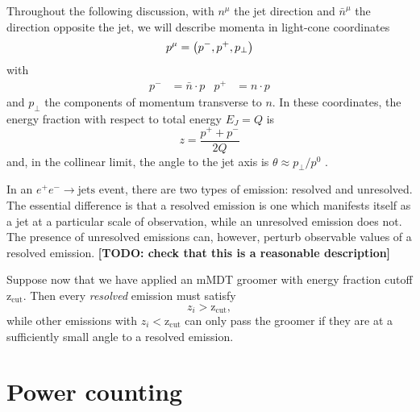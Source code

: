 \documentclass[12pt,twoside,class=../reedthesis, crop=false]{standalone}
\providecommand{\zcut}{\mathrm{z_{cut}}}
\begin{document}
	Throughout the following discussion, with $n^\mu$ the jet direction and $\bar n^\mu$ the direction opposite the jet, we will describe momenta in light-cone coordinates
	\begin{equation}
		p^\mu = \qty(p^-, p^+, p_\perp)
	\end{equation}
	with
	\begin{align}
		p^- &= \bar n \cdot p & p^+ &= n \cdot p
	\end{align}
	and $p_\perp$ the components of momentum transverse to $n$. In these coordinates, the energy fraction with respect to total energy $E_J = Q$ is
	\begin{equation}\label{eq:z light cone coordinates}
		z = \frac{p^+ + p^-}{2Q}
	\end{equation}
	and, in the collinear limit, the angle to the jet axis is $\theta \approx p_\perp / p^0$ \cite{frye_factorization_2016}.
	
	In an $e^+ e^- \to \text{jets}$ event, there are two types of emission: resolved and unresolved. The essential difference is that a resolved emission is one which manifests itself as a jet at a particular scale of observation, while an unresolved emission does not. The presence of unresolved emissions can, however, perturb observable values of a resolved emission. {\color{red}\textbf{[TODO: check that this is a reasonable description]}} 

	Suppose now that we have applied an mMDT groomer with energy fraction cutoff $\zcut$. Then every \textit{resolved} emission must satisfy
	\begin{equation}
		z_i > \zcut,
	\end{equation}
	while other emissions with $z_i < \zcut$ can only pass the groomer if they are at a sufficiently small angle to a resolved emission.

\section{Power counting}
\end{document}

